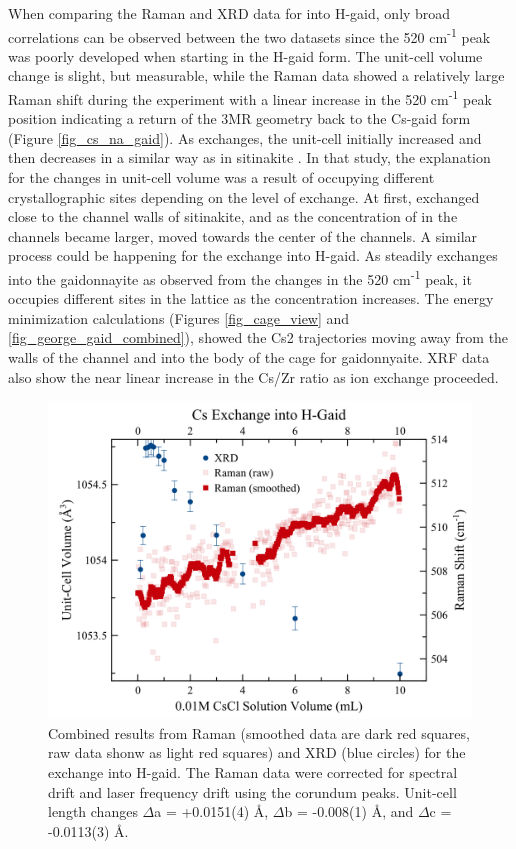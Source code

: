 \documentclass[journal=acsodf,manuscript=article]{achemso}
\begin{document}
When comparing the Raman and XRD data for  into
H-gaid, only broad correlations can be observed between the two datasets
since the 520 cm\textsuperscript{-1} peak was poorly developed when
starting in the H-gaid form.  The unit-cell volume change is slight, but
measurable, while the Raman data showed a relatively large Raman shift
during the experiment with a linear increase in the 520
cm\textsuperscript{-1} peak position indicating a return of the 3MR
geometry back to the Cs-gaid form
(Figure {\ref{fig_cs_na_gaid}}).  As 
exchanges, the unit-cell initially increased and then decreases in a
similar way as  in sitinakite \cite{Kramer_2012}. 
In that study, the explanation for the changes in unit-cell volume was a
result of  occupying different crystallographic
sites depending on the level of exchange.  At first,
 exchanged close to the channel walls of
sitinakite, and as the concentration of  in the
channels became larger,  moved towards the center
of the channels.  A similar process could be happening for the
 exchange into H-gaid. As 
steadily exchanges into the gaidonnayite as observed from the changes in
the 520 cm\textsuperscript{-1} peak, it occupies different sites in the
lattice as the concentration increases.  The energy minimization
calculations (Figures {\ref{fig_cage_view}}
and {\ref{fig_george_gaid_combined}}), showed the Cs2 trajectories moving
away from the walls of the channel and into the body of the cage for
gaidonnyaite.  XRF data also show the near linear increase in the Cs/Zr
ratio as ion exchange proceeded.  

 
\begin{figure}[h!]   %
\begin{center}
\includegraphics[width=0.70\columnwidth]{figures/XRD-Raman_Cs_into_H-gaid.png} 
\caption{{Combined results from Raman (smoothed data are dark red squares, raw data shonw as light red squares) and XRD (blue circles) for the
 exchange into H-gaid.  The Raman data were
corrected for spectral drift and laser frequency drift using the
corundum peaks.  Unit-cell length changes \(\Delta\)a =
+0.0151(4) \AA, \(\Delta\)b = -0.008(1)  \AA, and
\(\Delta\)c = -0.0113(3)  \AA.
{\label{fig_xrdraman_cs_h}}%
}}
\end{center}
\end{figure} 
\end{document}
